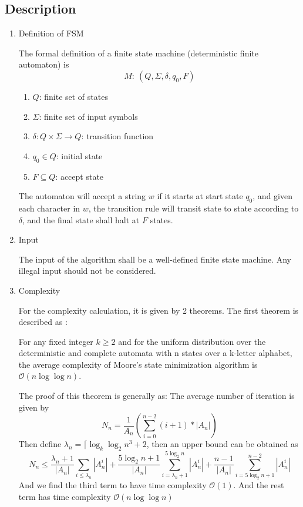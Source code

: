 \documentclass{article}
\begin{document}
\subsection*{Description}
\begin{enumerate}
\item Definition of FSM

The formal definition of a finite state machine (deterministic finite automaton) is 
\[
	M:~(Q, \Sigma, \delta, q_0, F)
\]
\begin{enumerate}
\item $Q$: finite set of states
\item $\Sigma$: finite set of input symbols
\item $\delta: Q\times \Sigma \rightarrow Q$: transition function 
\item $q_0 \in Q$: initial state
\item $F \subseteq Q$: accept state
\end{enumerate}
The automaton will accept a string $w$ if it starts at start state $q_0 $, and given each character in $w$, the transition rule will transit state to state according to $\delta$, and the final state shall halt at $F$ states.

\item Input 

The input of the algorithm shall be a well-defined finite state machine. Any illegal input should not be considered.

\item Complexity


For the complexity calculation, it is given by 2 theorems. The first theorem is described as :
\begin{center}
For any fixed integer $k\geq 2$ and for the uniform distribution over the deterministic and complete automata with n states over a k-letter alphabet, the average complexity of Moore’s state minimization algorithm is $\mathcal{O}(n \log \log n)$.
\end{center}
The proof of this theorem is generally as: The average number of iteration is given by
\[
	N_n=\frac{1}{A_n} (\sum_{i=0}^{n-2} (i+1) *|A_n|)
\]
Then define $\lambda_n= \lceil \log_k \log_2 n^3 +2 $, then an upper bound can be obtained as 
\[
	N_n \leq \frac{\lambda_n+1}{|A_n|} \sum_{i\leq \lambda_n} |A_n^i|+
	\frac{5\log_2n+1}{|A_n|} \sum_{i = \lambda_n+1}^{5 \log_2 n} |A_n^i|+
	\frac{n-1}{|A_n|} \sum_{i = 5 \log_2 n+1}^{n-2} |A_n^i|
\]	
And we find the third term to have time complexity $\mathcal{O}(1)$. And the rest term has time complexity $\mathcal{O}(n\log\log n )$


\end{enumerate}
\end{document}
